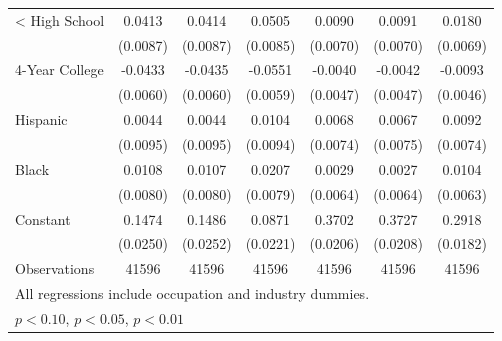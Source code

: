 {\begin{longtable}{l*{6}{c}}
< High School       &      0.0413\sym{***}&      0.0414\sym{***}&      0.0505\sym{***}&      0.0090         &      0.0091         &      0.0180\sym{***}\\
                    &    (0.0087)         &    (0.0087)         &    (0.0085)         &    (0.0070)         &    (0.0070)         &    (0.0069)         \\
4-Year College      &     -0.0433\sym{***}&     -0.0435\sym{***}&     -0.0551\sym{***}&     -0.0040         &     -0.0042         &     -0.0093\sym{**} \\
                    &    (0.0060)         &    (0.0060)         &    (0.0059)         &    (0.0047)         &    (0.0047)         &    (0.0046)         \\
Hispanic            &      0.0044         &      0.0044         &      0.0104         &      0.0068         &      0.0067         &      0.0092         \\
                    &    (0.0095)         &    (0.0095)         &    (0.0094)         &    (0.0074)         &    (0.0075)         &    (0.0074)         \\
Black               &      0.0108         &      0.0107         &      0.0207\sym{***}&      0.0029         &      0.0027         &      0.0104\sym{*}  \\
                    &    (0.0080)         &    (0.0080)         &    (0.0079)         &    (0.0064)         &    (0.0064)         &    (0.0063)         \\
Constant            &      0.1474\sym{***}&      0.1486\sym{***}&      0.0871\sym{***}&      0.3702\sym{***}&      0.3727\sym{***}&      0.2918\sym{***}\\
                    &    (0.0250)         &    (0.0252)         &    (0.0221)         &    (0.0206)         &    (0.0208)         &    (0.0182)         \\
\hline  
Observations        &       41596         &       41596         &       41596         &       41596         &       41596         &       41596         \\
\hline  
\multicolumn{7}{l}{\footnotesize All regressions include occupation and industry dummies.}\\
\multicolumn{7}{l}{\footnotesize \sym{*} \(p<0.10\), \sym{**} \(p<0.05\), \sym{***} \(p<0.01\)}\\
\end{longtable}
}
